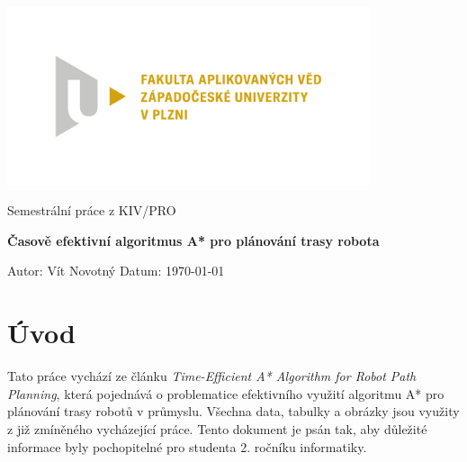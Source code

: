 \documentclass[10pt, a4paper]{article}
\begin{document}
\begin{titlepage}
    \includegraphics[width=0.80\textwidth]{images/fav.pdf}
    \begin{center}
        \vspace{2cm}

        \LARGE
        Semestrální práce z KIV/PRO

        \Huge
        \textbf{Časově efektivní algoritmus A* pro plánování trasy robota}

        \vspace{1cm}

        \vfill

        \vspace{0.5cm}

        \normalsize
        \raggedright
        Autor: Vít Novotný \hfill Datum: \today

        \vspace{0.2cm}

    \end{center}
\end{titlepage}

\thispagestyle{empty}
\pagebreak

\setcounter{page}{2}
\renewcommand{\cftsecleader}{\cftdotfill{\cftdotsep}}
\renewcommand{\cftsubsecleader}{\cftdotfill{\cftdotsep}}
\renewcommand{\cftsubsubsecleader}{\cftdotfill{\cftdotsep}}

\tableofcontents
\pagebreak


\section{Úvod}
Tato práce vychází ze článku \textit{Time-Efficient A* Algorithm for Robot Path Planning}\cite{MainWork}, která pojednává o problematice efektivního využití algoritmu A* pro plánování trasy robotů v průmyslu. Všechna data, tabulky a obrázky jsou využity z již zmíněného vycházející práce. Tento dokument je psán tak, aby důležité informace byly pochopitelné pro studenta 2. ročníku informatiky.
\end{document}
